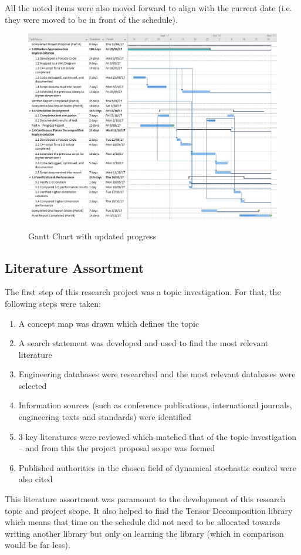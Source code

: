 \documentclass[11pt,draftd]{article}
\begin{document}
\noindent All the noted items were also moved forward to align with the current date (i.e. they were moved to be in front of the schedule).
\[\]
\begin{figure}[h!]
	\centering
	\includegraphics[scale=0.54]{UpdatedGanttProgressSem2}
	\label{UpdatedGanttProgress}
	\caption{Gantt Chart with updated progress}
\end{figure}
\newpage

\subsection{Literature Assortment}
The first step of this research project was a topic investigation. For that, the following steps were taken:
\begin{enumerate}
	\item A concept map was drawn which defines the topic
	\item A search statement was developed and used to find the most relevant literature
	\item Engineering databases were researched and the most relevant databases were selected
	\item Information sources (such as conference publications, international journals, engineering texts and standards) were identified
	\item 3 key literatures were reviewed which matched that of the topic investigation – and from this the project proposal scope was formed
	\item Published authorities in the chosen field of dynamical stochastic control were also cited	
\end{enumerate}
This literature assortment was paramount to the development of this research topic and project scope. It also helped to find the Tensor Decomposition library which means that time on the schedule did not need to be allocated towards writing another library but only on learning the library (which in comparison would be far less). \\
\end{document}
